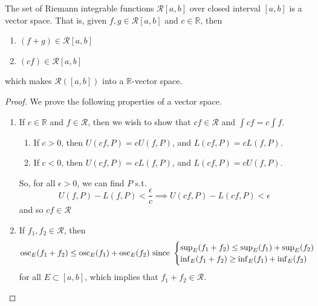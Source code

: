   \begin{theorem}
    The set of Riemann integrable functions $\mathcal{R}[a, b]$ over closed interval $[a, b]$ is a vector space. That is, given $f, g \in \mathcal{R}[a, b]$ and $c \in \mathbb{R}$, then
    \begin{enumerate}
      \item $(f + g) \in \mathcal{R}[a, b]$ 
      \item $(c f) \in \mathcal{R}[a, b]$
    \end{enumerate}
    which makes $\mathcal{R}([a, b])$ into a $\mathbb{R}$-vector space. 
  \end{theorem}
  \begin{proof} 
    We prove the following properties of a vector space. 
    \begin{enumerate}
      \item If $c \in \mathbb{R}$ and $f \in \mathcal{R}$, then we wish to show that $cf \in \mathcal{R}$ and $\int c f = c \int f$. 
      \begin{enumerate}
        \item If $c > 0$, then $U(cf, P) = c U(f, P)$, and $L(cf, P) = c L(f, P)$. 
        \item If $c < 0$, then $U(cf, P) = c L(f, P)$, and $L(cf, P) = c U(f, P)$. 
      \end{enumerate} 
      So, for all $\epsilon > 0$, we can find $P$ s.t. 
      \begin{equation}
        U(f, P) - L(f, P) < \frac{\epsilon}{c} \implies U(cf, P) - L(cf, P) < \epsilon
      \end{equation} 
      and so $cf \in \mathcal{R}$  

    \item If $f_1, f_2 \in \mathcal{R}$, then 
      \begin{equation}
        \osc_E (f_1 + f_2) \leq \osc_E (f_1) + \osc_E (f_2) \text{ since } \begin{cases} 
          \sup_E (f_1 + f_2) \leq \sup_E (f_1) + \sup_E (f_2) \\
          \inf_E (f_1 + f_2) \geq \inf_E (f_1) + \inf_E (f_2)
        \end{cases}
      \end{equation} 
      for all $E \subset [a, b]$, which implies that $f_1 + f_2 \in \mathcal{R}$. 
    \end{enumerate}
  \end{proof}


